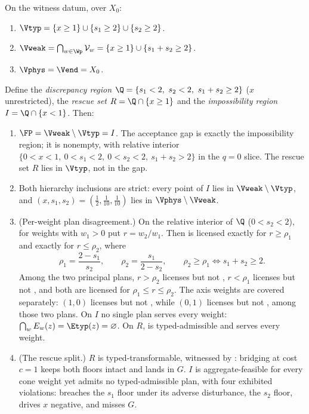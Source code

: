 \begin{theorem}\label{thm:witness}
On the witness datum, over $X_0$:
\begin{enumerate}[label=\textup{(\arabic*)},leftmargin=2em]
\item $\Vtyp=\{x\ge1\}\cup\{s_1\ge2\}\cup\{s_2\ge2\}$.
\item $\Vweak=\bigcap_{w\in\Wp}\mathcal V_w=\{x\ge1\}\cup\{s_1+s_2\ge2\}$.
\item $\Vphys=\Vend=X_0$.
\end{enumerate}
Define the \emph{discrepancy region} $\Q=\{s_1<2,\ s_2<2,\ s_1+s_2\ge2\}$ ($x$ unrestricted), the \emph{rescue set} $R=\Q\cap\{x\ge1\}$ and the \emph{impossibility region} $I=\Q\cap\{x<1\}$. Then:
\begin{enumerate}[label=\textup{(\arabic*)},leftmargin=2em,resume]
\item $\FP=\Vweak\setminus\Vtyp=I$. The acceptance gap is exactly the impossibility region; it is nonempty, with relative interior $\{0<x<1,\ 0<s_1<2,\ 0<s_2<2,\ s_1+s_2>2\}$ in the $q=0$ slice. The rescue set $R$ lies in $\Vtyp$, not in the gap.
\item Both hierarchy inclusions are strict: every point of $I$ lies in $\Vweak\setminus\Vtyp$, and $(x,s_1,s_2)=(\tfrac12,\tfrac1{10},\tfrac1{10})$ lies in $\Vphys\setminus\Vweak$.
\item \textup{(Per-weight plan disagreement.)} On the relative interior of $\Q$ ($0<s_2<2$), for weights with $w_1>0$ put $r=w_2/w_1$. Then  is licensed exactly for $r\ge\rho_1$ and  exactly for $r\le\rho_2$, where
\[
\rho_1=\frac{2-s_1}{s_2},\qquad \rho_2=\frac{s_1}{2-s_2},\qquad \rho_2\ge\rho_1\iff s_1+s_2\ge2 .
\]
Among the two principal plans, $r>\rho_2$ licenses  but not , $r<\rho_1$ licenses  but not , and both are licensed for $\rho_1\le r\le\rho_2$. The axis weights are covered separately: $(1,0)$ licenses  but not , while $(0,1)$ licenses  but not , among those two plans. On $I$ no single plan serves every weight: $\bigcap_wE_w(z)=\Etyp(z)=\varnothing$. On $R$,  is typed-admissible and serves every weight.
\item \textup{(The rescue split.)} $R$ is typed-transformable, witnessed by : bridging at cost $c=1$ keeps both floors intact and lands in $G$. $I$ is aggregate-feasible for every cone weight yet admits no typed-admissible plan, with four exhibited violations:  breaches the $s_1$ floor under its adverse disturbance,  the $s_2$ floor,  drives $x$ negative, and  misses $G$.
\end{enumerate}
\end{theorem}


